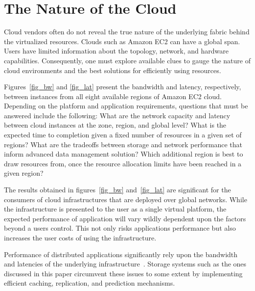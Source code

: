 \documentclass[10pt,journal,cspaper,compsoc]{IEEEtran}
\begin{document}
\section{The Nature of the Cloud}\label{sec:understanding}
Cloud vendors often do not reveal the true nature of the underlying fabric
behind the virtualized resources. Clouds such as Amazon EC2 can have a global
span. Users have limited information about the topology, network, and hardware
capabilities. Consequently, one must explore available clues to gauge the
nature of cloud environments and the best solutions for efficiently using
resources. 

Figures~\ref{fig_bw} and \ref{fig_lat} present the bandwidth and latency,
respectively, between instances from all eight available regions of Amazon EC2
cloud. Depending on the platform and application requirements, questions that
must be answered include the following: What are the network capacity and
latency between cloud instances at the zone, region, and global level? What is
the expected time to completion given a fixed number of resources in a given
set of regions? What are the tradeoffs between storage and network performance
that inform advanced data management solution?  Which additional region is best
to draw resources from, once the resource allocation limits have been reached
in a given region?

The results obtained in figures~\ref{fig_bw} and~\ref{fig_lat} are significant
for the consumers of cloud infrastructures that are deployed over global
networks. While the infrastructure is presented to the user as a single virtual
platform, the expected performance of application will vary wildly dependent
upon the factors beyond a users control. This not only risks applications
performance but also increases the user costs of using the infrastructure.

Performance of distributed applications significantly rely upon the bandwidth
and latencies of the underlying infrastructure~\cite{latency}. Storage systems
such as the ones discussed in this paper circumvent these issues to some extent
by implementing efficient caching, replication, and prediction mechanisms.
\end{document}

